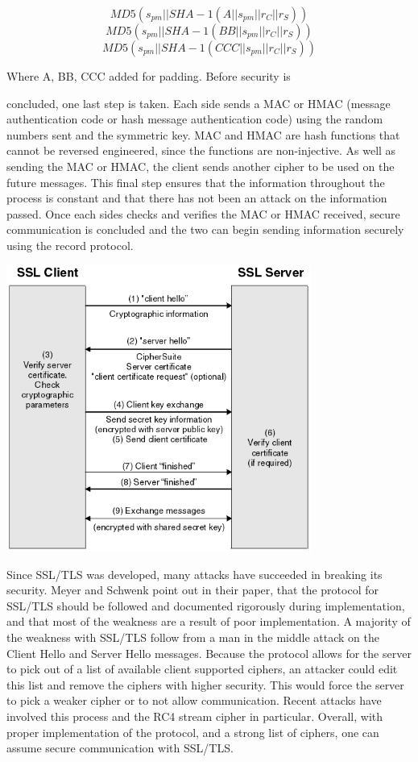 \[ MD5(s_{pm}||SHA-1(A||s_{pm}||r_{C}||r_{S})) \]
\[ MD5(s_{pm}||SHA-1(BB||s_{pm}||r_{C}||r_{S})) \]
\[ MD5(s_{pm}||SHA-1(CCC||s_{pm}||r_{C}||r_{S})) \] 

Where A, BB, CCC added for padding\cite[p. 282]{Trappe}.  Before security is

concluded, one last step is taken.  Each side sends a MAC or HMAC (message
authentication code or hash message authentication code) using the random
numbers sent and the symmetric key.  MAC and HMAC are hash functions that
cannot be reversed engineered, since the functions are non-injective.  As well
as sending the MAC or HMAC, the client sends another cipher to be used on the
future messages.  This final step ensures that the information throughout the
process is constant and that there has not been an attack on the information
passed.  Once each sides checks and verifies the MAC or HMAC received, secure
communication is concluded and the two can begin sending information
securely using the record protocol\cite[p. 58]{rescorla}.

\begin{center}
    \includegraphics[width=0.75\textwidth]{SSL_TLS_Diagram.png}
\end{center}

Since SSL/TLS was developed, many attacks have succeeded in breaking its
security.  Meyer and Schwenk point out in their paper, that the protocol for
SSL/TLS should be followed and documented rigorously during implementation, and
that most of the weakness are a result of poor implementation\cite[p.
14]{meyer}.  A majority of the weakness with SSL/TLS follow from a man in the
middle attack on the Client Hello and Server Hello messages.  Because the
protocol allows for the server to pick out of a list of available client
supported ciphers, an attacker could edit this list and remove the ciphers with
higher security.  This would force the server to pick a weaker cipher or to not
allow communication.  Recent attacks have involved this process and the RC4
stream cipher in particular.  Overall, with proper implementation of the
protocol, and a strong list of ciphers,  one can assume secure communication
with SSL/TLS.
